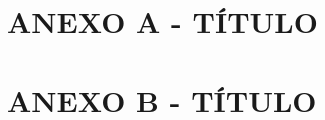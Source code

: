 \begin{anexosenv}
	\partanexos
	\chapter*{ANEXO A - TÍTULO}
	\lipsum[10]
	\chapter*{ANEXO B - TÍTULO}
	\lipsum[10]
\end{anexosenv}
